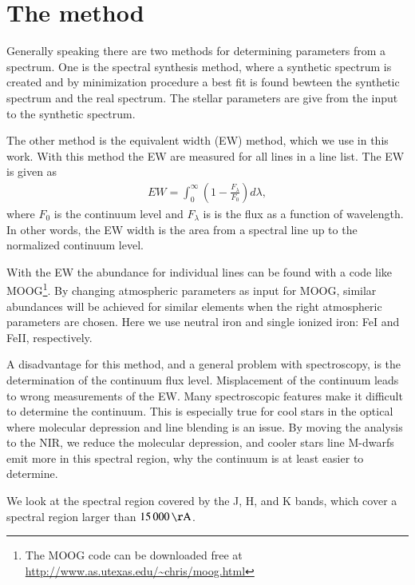 \documentclass{aa}
\begin{document}
\section{The method}
\label{sec:the_method}
Generally speaking there are two methods for determining parameters from a
spectrum.  One is the spectral synthesis method, where a synthetic spectrum is
created and by minimization procedure a best fit is found bewteen the synthetic
spectrum and the real spectrum. The stellar parameters are give from the input
to the synthetic spectrum.

The other method is the equivalent width (EW) method, which we use in this
work.  With this method the EW are measured for all lines in a line list. The
EW is given as
\begin{align}
    \label{eq:EW}
    EW = \int_0^\infty \left(1 - \frac{F_\lambda}{F_0}\right) d\lambda,
\end{align}
where $F_0$ is the continuum level and $F_\lambda$ is is the flux as a function
of wavelength. In other words, the EW width is the area from a spectral line up
to the normalized continuum level.

With the EW the abundance for individual lines can be found with a code like
MOOG\footnote{The MOOG code can be downloaded free at
\url{http://www.as.utexas.edu/~chris/moog.html}}. By changing atmospheric
parameters as input for MOOG, similar abundances will be achieved for similar
elements when the right atmospheric parameters are chosen. Here we use neutral
iron and single ionized iron: FeI and FeII, respectively.

A disadvantage for this method, and a general problem with spectroscopy, is the
determination of the continuum flux level. Misplacement of the continuum leads
to wrong measurements of the EW. Many spectroscopic features make it difficult
to determine the continuum. This is especially true for cool stars in the
optical where molecular depression and line blending is an issue. By moving the
analysis to the NIR, we reduce the molecular depression, and cooler stars line
M-dwarfs emit more in this spectral region, why the continuum is at least
easier to determine.

We look at the spectral region covered by the J, H, and K bands, which cover a
spectral region larger than $\SI{15000}{\AA}$.



\end{document}
